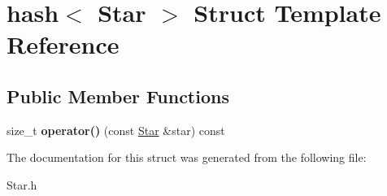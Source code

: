 \hypertarget{structhash_3_01_star_01_4}{}\section{hash$<$ Star $>$ Struct Template Reference}
\label{structhash_3_01_star_01_4}
\subsection*{Public Member Functions}
\begin{DoxyCompactItemize}
\item 
\mbox{\label{structhash_3_01_star_01_4_a44a7f1d031000267f72c64cbd91c4f3d}} 
size\+\_\+t {\bfseries operator()} (const \mbox{\hyperlink{class_star}{Star}} \&star) const
\end{DoxyCompactItemize}


The documentation for this struct was generated from the following file\+:\begin{DoxyCompactItemize}
\item 
Star.\+h\end{DoxyCompactItemize}
